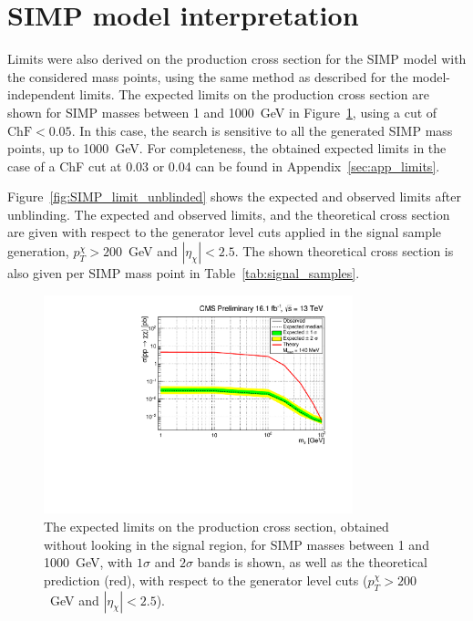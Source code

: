 \section{SIMP model interpretation}

Limits were also derived on the production cross section for the SIMP model with the considered mass points, using the same method as described for the model-independent limits.  The expected limits on the production cross section are shown for SIMP masses between 1 and 1000~GeV in Figure~\ref{fig:SIMP_limit}, using a cut of $\mathrm{ChF} < 0.05$. In this case, the search is sensitive to all the generated SIMP mass points, up to 1000~GeV. For completeness, the obtained expected limits in the case of a ChF cut at 0.03 or 0.04 can be found in Appendix~\ref{sec:app_limits}.

Figure~\ref{fig:SIMP_limit_unblinded} shows the expected and observed limits after unblinding. The expected and observed limits, and the theoretical cross section are given with respect to the generator level cuts applied in the signal sample generation, $p_T^{\chi} > 200$~GeV and $|\eta_{\chi}| < 2.5$. The shown theoretical cross section is also given per SIMP mass point in Table~\ref{tab:signal_samples}.

\begin{figure}[h]
  \centering
  \includegraphics[width=0.8\textwidth]{figures/SIMP_limit_ChF0p05.pdf}\hfill%
  \caption{The expected limits on the production cross section, obtained without looking in the signal region, for SIMP masses between 1 and 1000~GeV, with $1\sigma$ and $2\sigma$ bands is shown, as well as the theoretical prediction (red), with respect to the generator level cuts ($p_T^{\chi} > 200$~GeV and $|\eta_{\chi}| < 2.5$).}
  \label{fig:SIMP_limit}
\end{figure}

